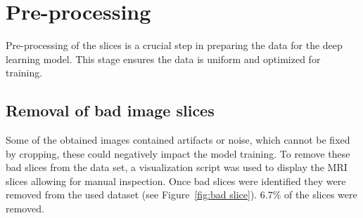 \documentclass[twocolumn]{article}
\begin{document}
\begin{table}[h]
\centering
{}
\caption{\label{tab:mri} Overview of the scan and image parameters used to acquire high- and low-resolution data of mice.}
\end{table}


\section{Pre-processing}

Pre-processing of the slices is a crucial step in preparing the data for the deep learning model. 
This stage ensures the data is uniform and optimized for training. 

\subsection{Removal of bad image slices}

Some of the obtained images contained artifacts or noise, which cannot be fixed by cropping, these could negatively impact the model training. 
To remove these bad slices from the data set, a visualization script was used to display the MRI slices allowing for manual inspection. 
Once bad slices were identified they were removed from the used dataset (see Figure~\ref{fig:bad slice}). 6.7\% of the slices were removed.
\end{document}
